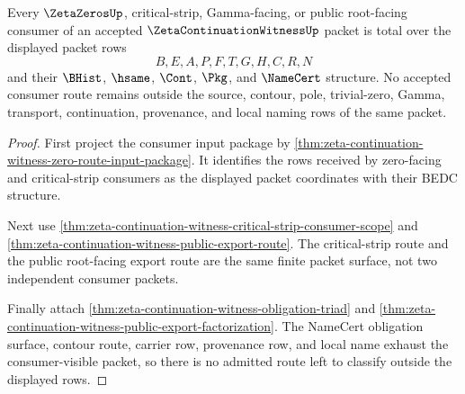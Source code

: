 \begin{theorem}
\label{thm:zeta-continuation-witness-consumer-packet-totality}
Every $\ZetaZerosUp$, critical-strip, Gamma-facing, or public root-facing consumer of an accepted $\ZetaContinuationWitnessUp$ packet is total over the displayed packet rows
$$
B,E,A,P,F,T,G,H,C,R,N
$$
and their $\BHist$, $\hsame$, $\Cont$, $\Pkg$, and $\NameCert$ structure. No accepted consumer route remains outside the source, contour, pole, trivial-zero, Gamma, transport, continuation, provenance, and local naming rows of the same packet.
\end{theorem}
\begin{proof}
First project the consumer input package by \autoref{thm:zeta-continuation-witness-zero-route-input-package}. It identifies the rows received by zero-facing and critical-strip consumers as the displayed packet coordinates with their BEDC structure.

Next use \autoref{thm:zeta-continuation-witness-critical-strip-consumer-scope} and \autoref{thm:zeta-continuation-witness-public-export-route}. The critical-strip route and the public root-facing export route are the same finite packet surface, not two independent consumer packets.

Finally attach \autoref{thm:zeta-continuation-witness-obligation-triad} and \autoref{thm:zeta-continuation-witness-public-export-factorization}. The NameCert obligation surface, contour route, carrier row, provenance row, and local name exhaust the consumer-visible packet, so there is no admitted route left to classify outside the displayed rows.
\end{proof}

